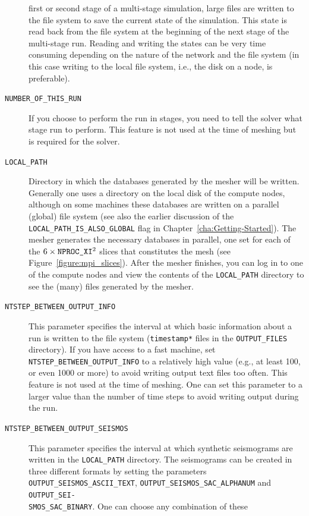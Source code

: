\documentclass[oneside,english]{book}
\newcommand{\nprocxi}{\mbox{\texttt{NPROC\_XI}}}
\begin{document}
\begin{description}
first or second stage of a multi-stage simulation, large files are
written to the file system to save the current state of the simulation.
This state is read back from the file system at the beginning of the
next stage of the multi-stage run. Reading and writing the states
can be very time consuming depending on the nature of the network
and the file system (in this case writing to the local file system,
i.e., the disk on a node, is preferable).
\item [{\texttt{NUMBER\_OF\_THIS\_RUN}}] If you choose to perform the run
in stages, you need to tell the solver what stage run to perform.
This feature is not used at the time of meshing but is required for
the solver.
\item [{\texttt{LOCAL\_PATH}}] Directory in which the databases generated
by the mesher will be written. Generally one uses a directory on the
local disk of the compute nodes, although on some machines these databases
are written on a parallel (global) file system (see also the earlier
discussion of the \texttt{LOCAL\_PATH\_IS\_ALSO\_GLOBAL} flag in Chapter~\ref{cha:Getting-Started}).
The mesher generates the necessary databases in parallel, one set
for each of the $6\times\nprocxi^{2}$ slices that constitutes the
mesh (see Figure~\ref{figure:mpi_slices}). After the mesher finishes,
you can log in to one of the compute nodes and view the contents of
the \texttt{LOCAL\_PATH} directory to see the (many) files generated
by the mesher.
\item [{\texttt{NTSTEP\_BETWEEN\_OUTPUT\_INFO}}] This parameter specifies
the interval at which basic information about a run is written to
the file system (\texttt{timestamp{*}} files in the \texttt{OUTPUT\_FILES}
directory). If you have access to a fast machine, set \texttt{NTSTEP\_BETWEEN\_OUTPUT\_INFO}
to a relatively high value (e.g., at least 100, or even 1000 or more)
to avoid writing output text files too often. This feature is not
used at the time of meshing. One can set this parameter to a larger
value than the number of time steps to avoid writing output during
the run.
\item [{\texttt{NTSTEP\_BETWEEN\_OUTPUT\_SEISMOS}}] This parameter specifies
the interval at which synthetic seismograms are written in the \texttt{LOCAL\_PATH}
directory. The seismograms can be created in three different formats
by setting the parameters \texttt{OUTPUT\_SEISMOS\_ASCII\_TEXT}, \texttt{OUTPUT\_SEISMOS\_SAC\_ALPHANUM}
and \texttt{OUTPUT\_SEI-}~\\
\texttt{SMOS\_SAC\_BINARY}. One can choose any combination of these

\end{description}
\end{document}
